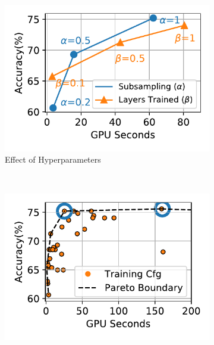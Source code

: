 
\begin{figure}[t]
  \centering
   \begin{subfigure}[t]{0.47\linewidth}
    \centering
    \includegraphics[width=\linewidth]{ekya/figures/motivation/AccuracyResourceProfile/jena_hypparams.pdf}
    \caption{\small Effect of Hyperparameters}
    \label{fig:hyparam-zoom}
  \end{subfigure}
  ~~~
  \begin{subfigure}[t]{0.48\linewidth}
    \centering
    \includegraphics[width=\linewidth]{ekya/figures/motivation/AccuracyResourceProfile/jena.pdf}

\end{subfigure}
\end{figure}
